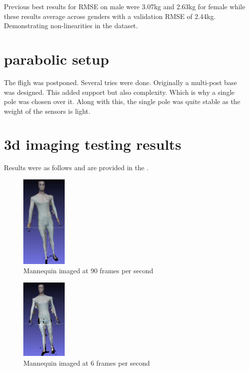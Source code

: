 Previous best results for RMSE on male were 3.07kg and 2.63kg for female while these results average across genders with a validation RMSE of 2.44kg. Demonstrating non-linearities in the dataset.

\section{parabolic setup}
The fligh was postponed. Several tries were done. Originally a multi-post base was designed. This added support but also complexity. Which is why a single pole was chosen over it. Along with this, the single pole was quite stable as the weight of the sensors is light.

\section{3d imaging testing results}
Results were as follows and are provided in the . 


\begin{figure}[h]
	\caption{Mannequin imaged at 90 frames per second}
	\centering
	\includegraphics[width=0.2\textwidth]{images/90fps_mannequin.png}
\end{figure}


\begin{figure}[h]
	\caption{Mannequin imaged at 6 frames per second}
	\centering
	\includegraphics[width=0.2\textwidth]{images/6fps_mannequin.png}
\end{figure}

